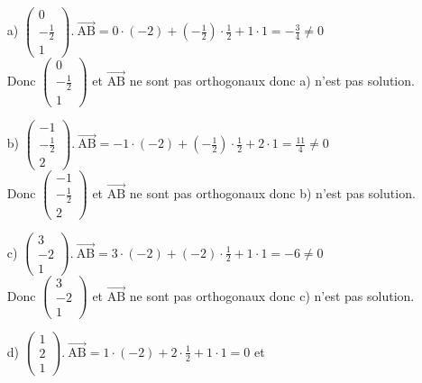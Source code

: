 \documentclass[a4paper, 12pt]{article}
\begin{document}
\begin{itemize}
    \item[a)] $\begin{pmatrix} 0 \\ -\frac{1}{2} \\ 1 \end{pmatrix} .\ \overrightarrow{\text{AB}} = 0 \cdot (-2) + (-\frac{1}{2}) \cdot \frac{1}{2} + 1 \cdot 1 = -\frac{3}{4} \neq 0$
        \\ Donc $\begin{pmatrix} 0 \\ -\frac{1}{2} \\ 1 \end{pmatrix}$  et $\overrightarrow{\text{AB}}$ ne sont pas orthogonaux donc a) n'est pas solution. \vspace{2mm}
    \item[b)] $\begin{pmatrix} -1 \\ -\frac{1}{2} \\ 2 \end{pmatrix} .\ \overrightarrow{\text{AB}} = -1 \cdot (-2) + (-\frac{1}{2}) \cdot \frac{1}{2} + 2 \cdot 1 = \frac{11}{4} \neq 0$
        \\ Donc $\begin{pmatrix} -1 \\ -\frac{1}{2} \\ 2 \end{pmatrix}$  et $\overrightarrow{\text{AB}}$ ne sont pas orthogonaux donc b) n'est pas solution. \vspace{2mm}
    \item[c)] $\begin{pmatrix} 3 \\ -2 \\ 1 \end{pmatrix} .\ \overrightarrow{\text{AB}} = 3 \cdot (-2) + (-2) \cdot \frac{1}{2} + 1 \cdot 1 = -6 \neq 0$
        \\ Donc $\begin{pmatrix} 3 \\ -2 \\ 1 \end{pmatrix}$  et $\overrightarrow{\text{AB}}$ ne sont pas orthogonaux donc c) n'est pas solution. \vspace{2mm}
    \item[d)] $\begin{pmatrix} 1 \\ 2 \\ 1 \end{pmatrix} .\ \overrightarrow{\text{AB}} = 1 \cdot (-2) + 2 \cdot \frac{1}{2} + 1 \cdot 1 = 0$ et

\end{itemize}
\end{document}
